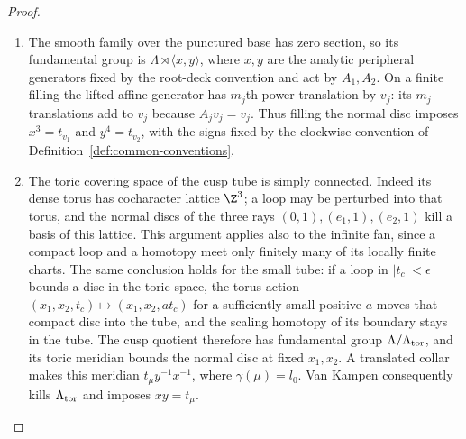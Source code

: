 \begin{proof}
\begin{enumerate}[label=\arabic*.,leftmargin=*]
\item The smooth family over the punctured base has zero section, so its
fundamental group is $\Lambda\rtimes\langle x,y\rangle$, where
$x,y$ are the analytic peripheral generators fixed by the root-deck convention and act by $A_1,A_2$.
On a finite filling the lifted affine generator has $m_j$th power
translation by $v_j$: its $m_j$ translations add to $v_j$ because
$A_jv_j=v_j$. Thus filling the normal disc imposes
$x^3=t_{v_1}$ and $y^4=t_{v_2}$, with the signs fixed by the
clockwise convention of Definition~\ref{def:common-conventions}.

\item The toric covering space of the cusp tube is simply connected.
Indeed its dense torus has cocharacter lattice $\Z^3$; a loop may
be perturbed into that torus, and the normal discs of the three rays
$(0,1),(e_1,1),(e_2,1)$ kill a basis of this lattice.
This argument applies also to the infinite fan, since a compact loop
and a homotopy meet only finitely many of its locally finite charts.
The same conclusion holds for the small tube: if a loop in
$|t_c|<\epsilon$ bounds a disc in the toric space, the torus action
$(x_1,x_2,t_c)\mapsto(x_1,x_2,a t_c)$ for a sufficiently small
positive $a$ moves that compact disc into the tube, and the scaling
homotopy of its boundary stays in the tube.
The cusp quotient therefore has fundamental group
$\Lambda/\Lambda_{\rm tor}$, and its toric meridian bounds the
normal disc at fixed $x_1,x_2$. A translated collar makes this
meridian $t_\mu y^{-1}x^{-1}$, where $\gamma(\mu)=l_0$.
Van Kampen consequently kills $\Lambda_{\rm tor}$ and imposes
$xy=t_\mu$.


\end{enumerate}
\end{proof}
